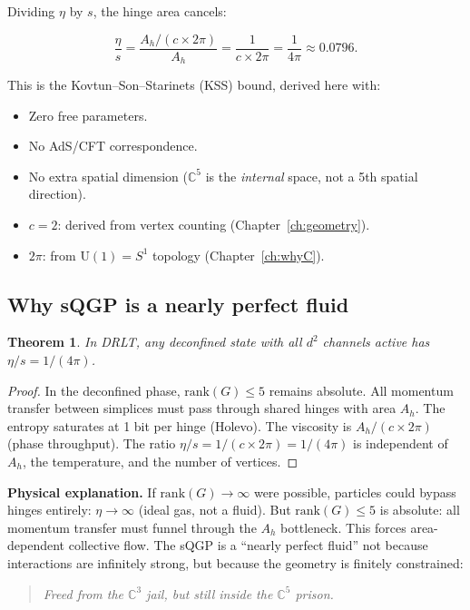 \documentclass[12pt]{article}
\newtheorem{theorem}{Theorem}[section]
\theoremstyle{remark}
\theoremstyle{definition}
\begin{document}
Dividing $\eta$ by $s$, the hinge area cancels:

\begin{equation}
\boxed{\frac{\eta}{s} = \frac{A_h/(c \times 2\pi)}{A_h} = \frac{1}{c \times 2\pi} = \frac{1}{4\pi} \approx 0.0796.}
\end{equation}

This is the Kovtun--Son--Starinets (KSS) bound, derived here with:
\begin{itemize}
\item Zero free parameters.
\item No AdS/CFT correspondence.
\item No extra spatial dimension ($\mathbb{C}^5$ is the \emph{internal} space, not a 5th spatial direction).
\item $c = 2$: derived from vertex counting (Chapter~\ref{ch:geometry}).
\item $2\pi$: from $\text{U}(1) = S^1$ topology (Chapter~\ref{ch:whyC}).
\end{itemize}

\subsection{Why sQGP is a nearly perfect fluid}

\begin{theorem}
In DRLT, any deconfined state with all $d^2$ channels active has $\eta/s = 1/(4\pi)$.
\end{theorem}

\begin{proof}
In the deconfined phase, $\text{rank}(G) \leq 5$ remains absolute. All momentum transfer between simplices must pass through shared hinges with area $A_h$. The entropy saturates at 1 bit per hinge (Holevo). The viscosity is $A_h/(c \times 2\pi)$ (phase throughput). The ratio $\eta/s = 1/(c \times 2\pi) = 1/(4\pi)$ is independent of $A_h$, the temperature, and the number of vertices.
\end{proof}

\textbf{Physical explanation.} If $\text{rank}(G) \to \infty$ were possible, particles could bypass hinges entirely: $\eta \to \infty$ (ideal gas, not a fluid). But $\text{rank}(G) \leq 5$ is absolute: all momentum transfer must funnel through the $A_h$ bottleneck. This forces area-dependent collective flow. The sQGP is a ``nearly perfect fluid'' not because interactions are infinitely strong, but because the geometry is finitely constrained:

\begin{quote}
\emph{Freed from the $\mathbb{C}^3$ jail, but still inside the $\mathbb{C}^5$ prison.}
\end{quote}
\end{document}
